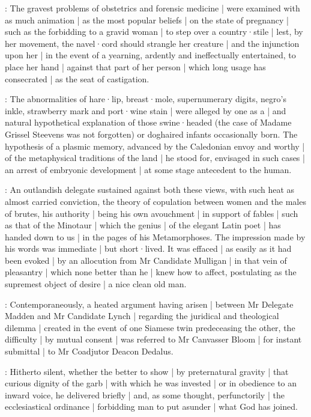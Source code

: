 :
The gravest problems of obstetrics and forensic medicine |
were examined with as much animation |
as the most popular beliefs |
on the state of pregnancy |
such as the forbidding to a gravid woman |
to step over a country·stile |
lest,
by her movement,
the navel·cord should strangle her creature |
and the injunction upon her |
in the event of a yearning,
ardently and ineffectually entertained,
to place her hand |
against that part of her person |
which long usage has consecrated |
as the seat of castigation.

:
The abnormalities of hare·lip,
breast·mole,
supernumerary digits,
negro's inkle,
strawberry mark and port·wine stain |
were alleged by one as a  |
and natural hypothetical explanation of those swine·headed
(the case of Madame Grissel Steevens was not forgotten)
or doghaired infants occasionally born.
The hypothesis of a plasmic memory,
advanced by the Caledonian envoy and worthy |
of the metaphysical traditions of the land |
he stood for,
envisaged in such cases |
an arrest of embryonic development |
at some stage antecedent to the human.

:
An outlandish delegate sustained against both these views,
with such heat as almost carried conviction,
the theory of copulation between women and the males of brutes,
his authority |
being his own avouchment |
in support of fables |
such as that of the Minotaur |
which the genius |
of the elegant Latin poet |
has handed down to us |
in the pages of his Metamorphoses.
The impression made by his words was immediate |
but short·lived.
It was effaced |
as easily as it had been evoked |
by an allocution from Mr Candidate Mulligan |
in that vein of pleasantry |
which none better than he |
knew how to affect,
postulating as the supremest object of desire |
a nice clean old man.

:
Contemporaneously,
a heated argument having arisen |
between Mr Delegate Madden and Mr Candidate Lynch |
regarding the juridical and theological dilemma |
created in the event of one Siamese twin predeceasing the other,
the difficulty |
by mutual consent |
was referred to Mr Canvasser Bloom |
for instant submittal |
to Mr Coadjutor Deacon Dedalus.

:
Hitherto silent,
whether the better to show |
by preternatural gravity |
that curious dignity of the garb |
with which he was invested |
or in obedience to an inward voice,
he delivered briefly |
and,
as some thought,
perfunctorily |
the ecclesiastical ordinance |
forbidding man to put asunder |
what God has joined.

